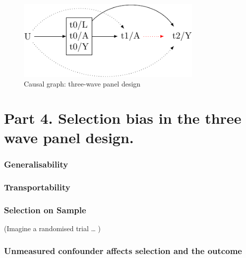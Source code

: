 \documentclass[
  singlecolumn]{report}
\begin{document}
\begin{figure}

{\centering \includegraphics[width=0.8\textwidth,height=\textheight]{causal-dags_files/figure-pdf/fig-dag-6-1.pdf}

}

\caption{\label{fig-dag-6}Causal graph: three-wave panel design}

\end{figure}

\hypertarget{part-4.-selection-bias-in-the-three-wave-panel-design.}{%
\section{Part 4. Selection bias in the three wave panel
design.}\label{part-4.-selection-bias-in-the-three-wave-panel-design.}}

\hypertarget{generalisability}{%
\subsubsection{Generalisability}\label{generalisability}}

\hypertarget{transportability}{%
\subsubsection{Transportability}\label{transportability}}

\hypertarget{selection-on-sample}{%
\subsubsection{Selection on Sample}\label{selection-on-sample}}

(Imagine a randomised trial \ldots{} )

\hypertarget{unmeasured-confounder-affects-selection-and-the-outcome}{%
\subsubsection{Unmeasured confounder affects selection and the
outcome}\label{unmeasured-confounder-affects-selection-and-the-outcome}}
\end{document}

